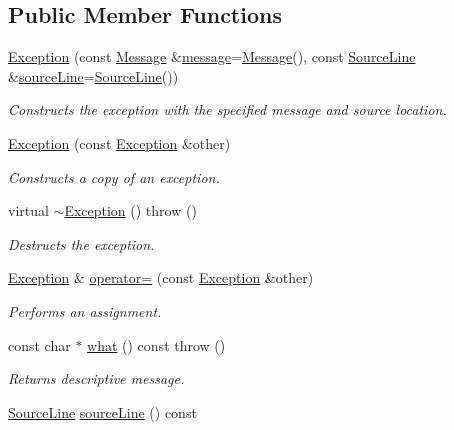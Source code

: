 \subsection*{Public Member Functions}
\begin{DoxyCompactItemize}
\item 
\hyperlink{class_exception_aac5e9386080a8eac2edebf02c8169ecc}{Exception} (const \hyperlink{class_message}{Message} \&\hyperlink{glew_8h_a76333d9470ffdd4811326932394d36da}{message}=\hyperlink{class_message}{Message}(), const \hyperlink{class_source_line}{Source\-Line} \&\hyperlink{class_exception_a67f40ff3ea7f1c07e46222c38dcbaf43}{source\-Line}=\hyperlink{class_source_line}{Source\-Line}())
\begin{DoxyCompactList}\small\item\em Constructs the exception with the specified message and source location. \end{DoxyCompactList}\item 
\hyperlink{class_exception_ae0fd52e62283ee92c085d767d0aab736}{Exception} (const \hyperlink{class_exception}{Exception} \&other)
\begin{DoxyCompactList}\small\item\em Constructs a copy of an exception. \end{DoxyCompactList}\item 
virtual \hyperlink{class_exception_ad1ba411de295ef2eeb02ba26284a829a}{$\sim$\-Exception} ()  throw ()
\begin{DoxyCompactList}\small\item\em Destructs the exception. \end{DoxyCompactList}\item 
\hyperlink{class_exception}{Exception} \& \hyperlink{class_exception_a71c844ee3ac32b7656c24386e9ab60a0}{operator=} (const \hyperlink{class_exception}{Exception} \&other)
\begin{DoxyCompactList}\small\item\em Performs an assignment. \end{DoxyCompactList}\item 
const char $\ast$ \hyperlink{class_exception_a45642915395d3b813fedc2593fbcb8bb}{what} () const   throw ()
\begin{DoxyCompactList}\small\item\em Returns descriptive message. \end{DoxyCompactList}\item 
\hyperlink{class_source_line}{Source\-Line} \hyperlink{class_exception_a67f40ff3ea7f1c07e46222c38dcbaf43}{source\-Line} () const 

\end{DoxyCompactItemize}
